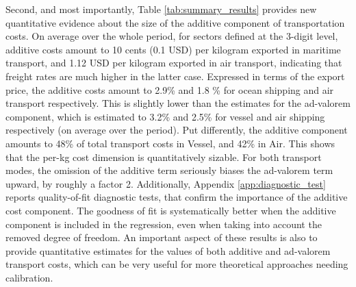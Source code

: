 \documentclass[a4paper,11pt]{article}
\begin{document}
Second, and most importantly, Table \ref{tab:summary_results} provides new quantitative evidence about the size of the additive component of transportation costs.
On average over the whole period, for sectors defined at the 3-digit level, additive costs amount to 10 cents (0.1 USD) per kilogram exported in maritime transport, and 1.12 USD per kilogram exported in air transport, indicating that freight rates are much higher in the latter case.
Expressed in terms of the export price, the additive costs amount to 2.9\% and 1.8 \% for ocean shipping and air transport respectively.
This is slightly lower than the estimates for the ad-valorem component, which is estimated to 3.2\% and 2.5\% for vessel and air shipping respectively (on average over the period).
Put differently, the additive component amounts to 48\% of total transport costs in Vessel, and 42\% in Air.
This shows that the per-kg cost dimension is quantitatively sizable.
For both transport modes, the omission of the additive term seriously biases the ad-valorem term upward, by roughly a factor 2.
Additionally, Appendix \ref{app:diagnostic_test} reports quality-of-fit diagnostic tests, that confirm the importance of the additive cost component.
The goodness of fit is systematically better when the additive component is included in the regression, even when taking into account the removed degree of freedom.
An important aspect of these results is also to provide quantitative estimates for the values of both additive and ad-valorem transport costs, which can be very useful for more theoretical approaches needing calibration.%
\end{document}
